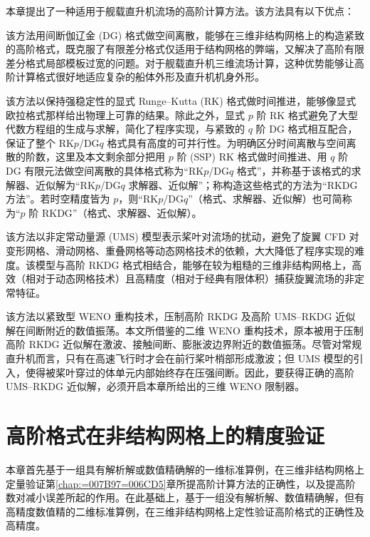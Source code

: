 本章提出了一种适用于舰载直升机流场的高阶计算方法。该方法具有以下优点：
\begin{description}[wide]
\item [{能够处理几何外形复杂的边界}] 该方法用间断伽辽金 (DG) 格式做空间离散，能够在三维非结构网格上的构造紧致的高阶格式，既克服了有限差分格式仅适用于结构网格的弊端，又解决了高阶有限差分格式局部模板过宽的问题。对于舰载直升机三维流场计算，这种优势能够让高阶计算格式很好地适应复杂的船体外形及直升机机身外形。
\item [{能够保持数值解的强稳定性}] 该方法以保持强稳定性的显式 Runge–Kutta (RK) 格式做时间推进，能够像显式欧拉格式那样给出物理上可靠的结果。除此之外，显式
$p$ 阶 RK 格式避免了大型代数方程组的生成与求解，简化了程序实现，与紧致的 $q$ 阶 DG 格式相互配合，保证了整个 RK$p$/DG$q$
格式具有高度的可并行性。为明确区分时间离散与空间离散的阶数，这里及本文剩余部分把用 $p$ 阶 (SSP) RK 格式做时间推进、用
$q$ 阶 DG 有限元法做空间离散的具体格式称为“RK$p$/DG$q$ 格式”，并称基于该格式的求解器、近似解为“RK$p$/DG$q$
求解器、近似解”；称构造这些格式的方法为“RKDG 方法”。若时空精度皆为 $p$，则“RK$p$/DG$q$”（格式、求解器、近似解）也可简称为“$p$
阶 RKDG”（格式、求解器、近似解）。
\item [{避免了对动态网格技术的依赖}] 该方法以非定常动量源 (UMS) 模型表示桨叶对流场的扰动，避免了旋翼 CFD 对变形网格、滑动网格、重叠网格等动态网格技术的依赖，大大降低了程序实现的难度。该模型与高阶
RKDG 格式相结合，能够在较为粗糙的三维非结构网格上，高效（相对于动态网格技术）且高精度（相对于经典有限体积）捕获旋翼流场的非定常特征。
\item [{压制了高阶近似解的数值振荡}] 该方法以紧致型 WENO 重构技术，压制高阶 RKDG 及高阶 UMS–RKDG 近似解在间断附近的数值振荡。本文所借鉴的二维
WENO 重构技术，原本被用于压制高阶 RKDG 近似解在激波、接触间断、膨胀波边界附近的数值振荡。尽管对常规直升机而言，只有在高速飞行时才会在前行桨叶梢部形成激波；但
UMS 模型的引入，使得被桨叶穿过的体单元内部始终存在压强间断。因此，要获得正确的高阶 UMS–RKDG 近似解，必须开启本章所给出的三维
WENO 限制器。
\end{description}
%

\chapter{高阶格式在非结构网格上的精度验证\label{chap:=009A8C=008BC1}}

本章首先基于一组具有解析解或数值精确解的一维标准算例，在三维非结构网格上定量验证第\ref{chap:=007B97=006CD5}章所提高阶计算方法的正确性，以及提高阶数对减小误差所起的作用。在此基础上，基于一组没有解析解、数值精确解，但有高精度数值精的二维标准算例，在三维非结构网格上定性验证高阶格式的正确性及高精度。

